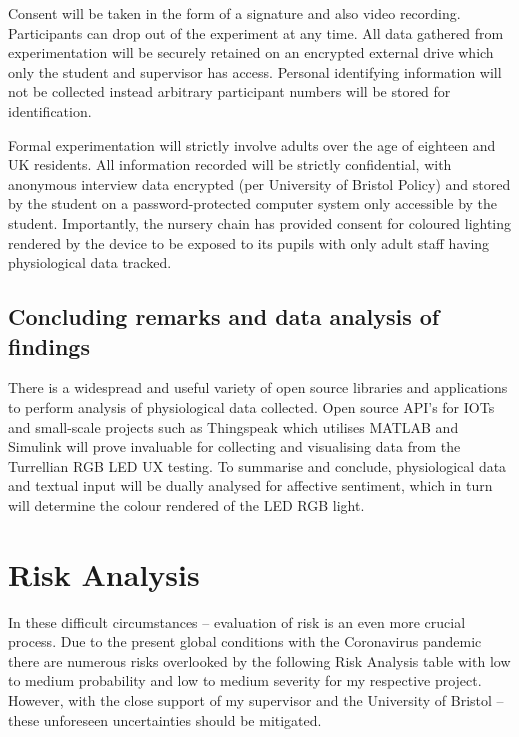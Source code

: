 \documentclass{sigchi}
\begin{document}
Consent will be taken in the form of a signature and also video recording. Participants can drop out of the experiment at any time. All data gathered from experimentation will be securely retained on an encrypted external drive which only the student and supervisor has access. Personal identifying information will not be collected instead arbitrary participant numbers will be stored for identification. 

Formal experimentation will strictly involve adults over the age of eighteen and UK residents. All information recorded will be strictly confidential, with anonymous interview data encrypted (per University of Bristol Policy) and stored by the student on a password-protected computer system only accessible by the student. Importantly, the nursery chain has provided consent for coloured lighting rendered by the device to be exposed to its pupils with only adult staff having physiological data tracked. 

\subsection{Concluding remarks and data analysis of findings}

There is a widespread and useful variety of open source libraries and applications to perform analysis of physiological data collected. Open source API’s for IOTs and small-scale projects such as Thingspeak which utilises MATLAB and Simulink will prove invaluable for collecting and visualising data from the Turrellian RGB LED UX testing. To summarise and conclude, physiological data and textual input will be dually analysed for affective sentiment, which in turn will determine the colour rendered of the LED RGB light.



\section{Risk Analysis}

In these difficult circumstances – evaluation of risk is an even more crucial process. Due to the present global conditions with the Coronavirus pandemic there are numerous risks overlooked by the following Risk Analysis table with low to medium probability and low to medium severity for my respective project. However, with the close support of my supervisor and the University of Bristol – these unforeseen uncertainties should be mitigated.
\end{document}

